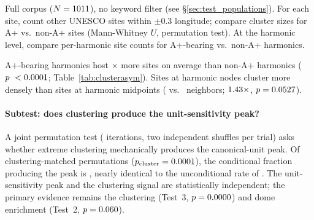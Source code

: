 \documentclass[HARVARD,twocolumn]{USG}
\begin{document}
Full corpus ($N = \NclusterTotal$), no keyword filter (see \S\ref{sec:test_populations}).
For each site, count other UNESCO sites within $\pm 0.3$\textdegree{}
longitude; compare cluster sizes for A+ vs.\ non-A+ sites (Mann-Whitney $U$,
permutation test). At the harmonic level, compare per-harmonic site counts
for A+-bearing vs.\ non-A+ harmonics.

\begin{table}[!t]
\centering
\caption{Cluster asymmetry: A+ vs.\ non-A+ sites in the full UNESCO corpus
  ($N = \NclusterTotal$; cluster radius $\pm 0.3$\textdegree{} lon)}
\label{tab:clusterasym}
\small
{}%
\end{table}

\noindent A+-bearing harmonics host \clusterHarmonicRatio$\times$ more sites
on average than non-A+ harmonics ($p\ < 0.0001$;
Table~\ref{tab:clusterasym}).
Sites at harmonic nodes cluster more densely than sites at harmonic midpoints
(\clusterNodeApMean{} vs.\ \clusterAntiApMean{} neighbors;
$1.43\times$, $p = 0.0527$).

\paragraph*{Subtest: does clustering produce the unit-sensitivity peak?}
\label{sec:cluster_cond_sensitivity}
A joint permutation test (\clusterCondN{} iterations, two independent shuffles
per trial) asks whether extreme clustering mechanically produces the
canonical-unit peak. Of \clusterCondClusterOk{} clustering-matched
permutations ($p_\mathrm{cluster} = 0.0001$), the conditional fraction
producing the peak is \clusterCondPeakFrac{}, nearly identical to the
unconditional rate of \clusterCondPeakFracUncond{}. The unit-sensitivity
peak and the clustering signal are statistically independent; the primary
evidence remains the clustering (Test~3, $p = 0.0000$) and dome
enrichment (Test~2, $p = 0.060$).
\end{document}
